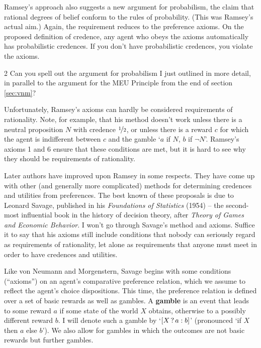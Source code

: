 Ramsey's approach also suggests a new argument for probabilism, the claim that
rational degrees of belief conform to the rules of probability. (This was
Ramsey's actual aim.) Again, the requirement reduces to the preference axioms.
On the proposed definition of credence, any agent who obeys the axioms
automatically has probabilistic credences. If you don't have probabilistic
credences, you violate the axioms.

\begin{exercise}{2}
  Can you spell out the argument for probabilism I just outlined in more detail,
  in parallel to the argument for the MEU Principle from the end of section
  \ref{sec:vnm}?
\end{exercise}

Unfortunately, Ramsey's axioms can hardly be considered requirements of
rationality. Note, for example, that his method doesn't work unless there is a
neutral proposition $N$ with credence $\nicefrac{1}{2}$, or unless there is a
reward $c$ for which the agent is indifferent between $c$ and the gamble `$a$ if
$N$, $b$ if $\neg N$'. Ramsey's axioms 1 and 6 ensure that these conditions are
met, but it is hard to see why they should be requirements of rationality.

Later authors have improved upon Ramsey in some respects. They have come up with
other (and generally more complicated) methods for determining credences and
utilities from preferences. The best known of these proposals is due to Leonard
Savage, published in his \emph{Foundations of Statistics} (1954) -- the
second-most influential book in the history of decision theory, after \emph{Theory
  of Games and Economic Behavior}. I won't go through Savage's method and axioms.
Suffice it to say that his axioms still include conditions that nobody can
seriously regard as requirements of rationality, let alone as requirements that
anyone must meet in order to have credences and utilities.

\iffalse

Like von Neumann and Morgenstern, Savage begins with some conditions
(``axioms'') on an agent's comparative preference relation, which we assume to
reflect the agent's choice dispositions. This time, the preference relation is
defined over a set of basic rewards as well as gambles. A \textbf{gamble} is an
event that leads to some reward $a$ if some state of the world $X$ obtains,
otherwise to a possibly different reward $b$. I will denote such a gamble by
`$[X\,?\, a :b]$' (pronounced `if $X$ then $a$ else $b$'). We also allow for
gambles in which the outcomes are not basic rewards but further gambles.

